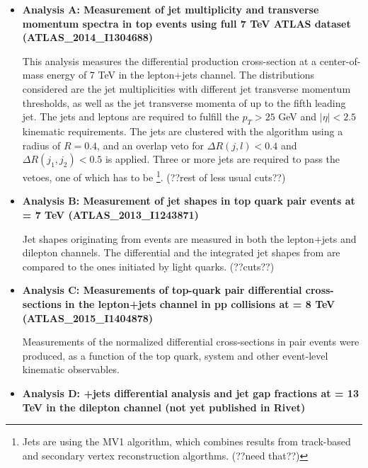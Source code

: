 \documentclass[PUB, UKenglish, texlive=2016]{\ATLASLATEXPATH atlasdoc}
\begin{document}
\begin{itemize}

\item \textbf{Analysis A: Measurement of jet multiplicity and transverse momentum spectra in top events using full 7 TeV ATLAS dataset (ATLAS\_2014\_I1304688) \cite{Aad:2014iaa}}

This analysis measures the differential \ttbar production cross-section at a center-of-mass energy of 7 TeV in the lepton+jets channel. The distributions considered are the jet multiplicities with different jet transverse momentum thresholds, as well as the jet transverse momenta of up to the fifth leading jet. The jets and leptons are required to fulfill the $p_T > 25$ GeV and $|\eta| < 2.5$ kinematic requirements. The jets are clustered with the \antikt algorithm using a radius of $R=0.4$, and an overlap veto for $\Delta R(j, l) < 0.4$ and $\Delta R(j_1, j_2)<0.5$ is applied. Three or more jets are required to pass the vetoes, one of which has to be \btagged \footnote{Jets are \btagged using the MV1 algorithm, which combines results from track-based and secondary vertex reconstruction algorthms. (??need that??)}. (??rest of less usual cuts??)

\item \textbf{Analysis B: Measurement of jet shapes in top quark pair events at \sqs = 7 TeV (ATLAS\_2013\_I1243871) \cite{Aad:2013fba}}

Jet shapes originating from \ttbar events are measured in both the lepton+jets and dilepton channels. The differential and the integrated jet shapes from \bjets are compared to the ones initiated by light quarks. (??cuts??)

\item \textbf{Analysis C: Measurements of top-quark pair differential cross-sections in the lepton+jets channel in pp collisions at \sqs = 8 TeV (ATLAS\_2015\_I1404878) \cite{Aad:2015mbv}}

Measurements of the normalized differential cross-sections in \ttbar pair events were produced, as a function of the top quark, \ttbar system and other event-level kinematic observables.

\item \textbf{Analysis D: \ttbar+jets differential analysis and jet gap fractions at \sqs = 13 TeV in the dilepton channel (not yet published in Rivet)}


\end{itemize}

\end{document}
